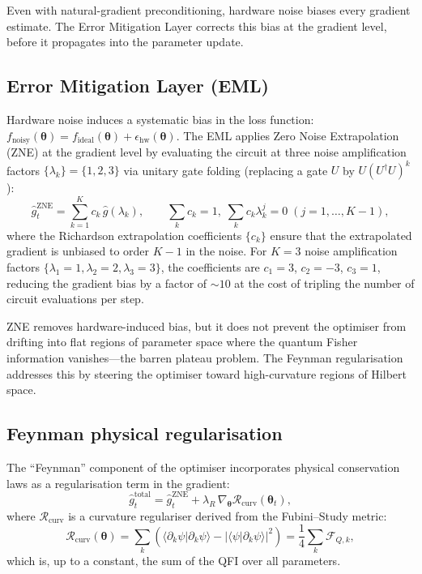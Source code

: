 \documentclass[11pt,a4paper, english]{book}
\theoremstyle{plain}
\theoremstyle{definition}
\numberwithin{equation}{chapter}
\numberwithin{figure}{chapter}
\numberwithin{table}{chapter}
\begin{document}
Even with natural-gradient preconditioning, hardware noise biases every gradient
estimate. The Error Mitigation Layer corrects this bias at the gradient level,
before it propagates into the parameter update.

\subsection{Error Mitigation Layer (EML)}
\label{subsec:eml}

Hardware noise induces a systematic bias in the loss function:
$f_\mathrm{noisy}(\boldsymbol{\theta}) = f_\mathrm{ideal}(\boldsymbol{\theta})
+ \epsilon_\mathrm{hw}(\boldsymbol{\theta})$.  The EML applies Zero Noise
Extrapolation (ZNE) at the gradient level by evaluating the circuit at
three noise amplification factors $\{\lambda_k\} = \{1, 2, 3\}$ via
unitary gate folding (replacing a gate $U$ by $U(U^\dagger U)^k$):
\begin{equation}
  \label{eq:zne_gradient}
  \hat{g}^\mathrm{ZNE}_t = \sum_{k=1}^{K} c_k\,\hat{g}(\lambda_k),
  \qquad
  \sum_k c_k = 1,\; \sum_k c_k\lambda_k^j = 0 \; (j=1,\ldots,K-1),
\end{equation}
where the Richardson extrapolation coefficients $\{c_k\}$ ensure that the
extrapolated gradient is unbiased to order $K-1$ in the noise.  For
$K=3$ noise amplification factors $\{\lambda_1=1, \lambda_2=2, \lambda_3=3\}$,
the coefficients are $c_1 = 3$, $c_2 = -3$, $c_3 = 1$,
reducing the gradient bias by a factor of $\sim\!\!10$ at the cost of
tripling the number of circuit evaluations per step.

ZNE removes hardware-induced bias, but it does not prevent the optimiser from
drifting into flat regions of parameter space where the quantum Fisher information
vanishes—the barren plateau problem. The Feynman regularisation addresses this by
steering the optimiser toward high-curvature regions of Hilbert space.

\subsection{Feynman physical regularisation}
\label{subsec:feynman}

The ``Feynman'' component of the optimiser incorporates physical
conservation laws as a regularisation term in the gradient:
\begin{equation}
  \label{eq:feynman_reg}
  \hat{g}^\mathrm{total}_t =
    \hat{g}^\mathrm{ZNE}_t + \lambda_R\,\nabla_{\boldsymbol{\theta}}
    \mathcal{R}_\mathrm{curv}(\boldsymbol{\theta}_t),
\end{equation}
where $\mathcal{R}_\mathrm{curv}$ is a curvature regulariser derived from
the Fubini--Study metric:
\begin{equation}
  \label{eq:curvature_reg}
  \mathcal{R}_\mathrm{curv}(\boldsymbol{\theta}) =
    \sum_{k} \left(
      \langle\partial_k\psi|\partial_k\psi\rangle
      - |\langle\psi|\partial_k\psi\rangle|^2
    \right)
    = \frac{1}{4}\sum_k \mathcal{F}_{Q,k},
\end{equation}
which is, up to a constant, the sum of the QFI over all parameters.
\end{document}
